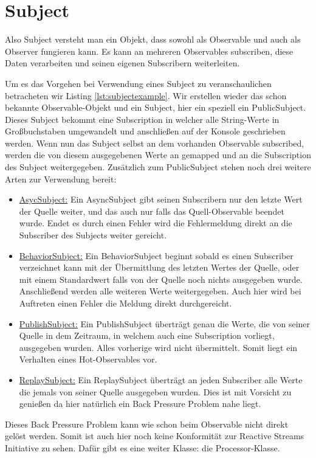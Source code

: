 \section{Subject}
Also Subject versteht man ein Objekt, dass sowohl als Observable und auch als Observer fungieren kann. Es kann an mehreren Observables subscriben, diese Daten verarbeiten und seinen eigenen Subscribern weiterleiten. 

Um es das Vorgehen bei Verwendung eines Subject zu veranschaulichen betracheten wir Listing \ref{lst:subjectexample}. Wir erstellen wieder das schon bekannte Observable-Objekt und ein Subject, hier ein speziell ein PublicSubject. Dieses Subject bekommt eine Subscription in welcher alle String-Werte in Großbuchstaben umgewandelt und anschließen auf der Konsole geschrieben werden. Wenn nun das Subject selbst an dem vorhanden Observable subscribed, werden die von diesem ausgegebenen Werte an gemapped und an die Subscription des Subject weitergegeben. Zusätzlich zum PublicSubject stehen noch drei weitere Arten zur Verwendung bereit:
\begin{itemize}
	\item \underline{AsycSubject:} Ein AsyncSubject gibt seinen Subscribern nur den letzte Wert der Quelle weiter, und das auch nur falls das Quell-Observable beendet wurde. Endet es durch einen Fehler wird die Fehlermeldung direkt an die Subscriber des Subjects weiter gereicht.
	\item \underline{BehaviorSubject:} Ein BehaviorSubject beginnt sobald es einen Subscriber verzeichnet kann mit der Übermittlung des letzten Wertes der Quelle, oder mit einem Standardwert falls von der Quelle noch nichts ausgegeben wurde. Anschließend werden alle weiteren Werte weitergegeben. Auch hier wird bei Auftreten einen Fehler die Meldung direkt durchgereicht.
	\item \underline{PublishSubject:} Ein PublishSubject überträgt genau die Werte, die von seiner Quelle in dem Zeitraum, in welchem auch eine Subscription vorliegt, ausgegeben wurden. Alles vorherige wird nicht übermittelt. Somit liegt ein Verhalten eines Hot-Observables vor.
	\item \underline{ReplaySubject:} Ein ReplaySubject überträgt an jeden Subscriber alle Werte die jemals von seiner Quelle ausgegeben wurden. Dies ist mit Vorsicht zu genießen da hier natürlich ein Back Pressure Problem nahe liegt. 
\end{itemize}
Dieses Back Pressure Problem kann wie schon beim Observable nicht direkt gelöst werden. Somit ist auch hier noch keine Konformität zur Reactive Streams Initiative zu sehen. Dafür gibt es eine weiter Klasse: die Processor-Klasse.
